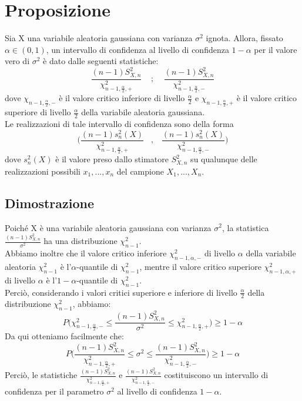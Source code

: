 \documentclass{article}
\begin{document}
\section*{Proposizione}
Sia X una variabile aleatoria gaussiana con varianza $\sigma^{2}$ ignota. Allora, fissato $\alpha \in (0,1)$, un intervallo di confidenza al livello di confidenza $1-\alpha$ per il valore vero di $\sigma^{2}$ è dato dalle seguenti statistiche:
\[ \frac{(n-1)S_{X,n}^{2}}{\chi_{n-1,\frac{\alpha}{2},+}^{2}} \; \; \; \; ; \; \; \; \; \frac{(n-1)S_{X,n}^{2}}{\chi_{n-1,\frac{\alpha}{2},-}^{2}} \]
dove $\chi_{n-1,\frac{\alpha}{2},-}$ è il valore critico inferiore di livello $\frac{\alpha}{2}$ e $\chi_{n-1,\frac{\alpha}{2},+}$ è il valore critico superiore di livello $\frac{\alpha}{2}$ della variabile aleatoria gaussiana.\\
Le realizzazioni di tale intervallo di confidenza sono della forma
\[ \Bigg( \frac{(n-1)s_{n}^{2}(X)}{\chi_{n-1,\frac{\alpha}{2},+}^{2}} \; \; \; , \; \; \; \frac{(n-1)s_{n}^{2}(X)}{\chi_{n-1,\frac{\alpha}{2},-}^{2}} \Bigg) \]
dove $s_{n}^{2}(X)$ è il valore preso dallo stimatore $S_{X,n}^{2}$ su qualunque delle realizzazioni possibili $x_{1},...,x_{n}$ del campione $X_{1},...,X_{n}$.

\subsection*{Dimostrazione}
Poiché X è una variabile aleatoria gaussiana con varianza $\sigma^{2}$, la statistica $\frac{(n-1)S_{X,n}^{2}}{\sigma^{2}}$ ha una distribuzione $\chi_{n-1}^{2}$.\\
Abbiamo inoltre che il valore critico inferiore $\chi_{n-1,\alpha,-}^{2}$ di livello $\alpha$ della variabile aleatoria $\chi_{n-1}^{2}$ è l'$\alpha$-quantile di $\chi_{n-1}^{2}$, mentre il valore critico superiore $\chi_{n-1,\alpha,+}^{2}$ di livello $\alpha$ è l'$1-\alpha$-quantile di $\chi_{n-1}^{2}$.\\
Perciò, considerando i valori critici superiore e inferiore di livello $\frac{\alpha}{2}$ della distribuzione $\chi_{n-1}^{2}$, abbiamo:
\[ P\Bigg( \chi_{n-1,\frac{\alpha}{2},-}^{2} \leq \frac{(n-1)S_{X,n}^{2}}{\sigma^{2}} \leq \chi_{n-1,\frac{\alpha}{2},+}^{2} \Bigg) \geq 1-\alpha \]
Da qui otteniamo facilmente che:
\[ P\Bigg( \frac{(n-1)S_{X,n}^{2}}{\chi_{n-1,\frac{\alpha}{2},+}^{2}} \leq \sigma^{2} \leq \frac{(n-1)S_{X,n}^{2}}{\chi_{n-1,\frac{\alpha}{2},-}^{2}} \Bigg) \geq 1-\alpha \]
Perciò, le statistiche $\frac{(n-1)S_{X,n}^{2}}{\chi_{n-1,\frac{\alpha}{2},+}^{2}}$ e $\frac{(n-1)S_{X,n}^{2}}{\chi_{n-1,\frac{\alpha}{2},-}^{2}}$ costituiscono un intervallo di confidenza per il parametro $\sigma^{2}$ al livello di confidenza $1-\alpha$.
\end{document}
